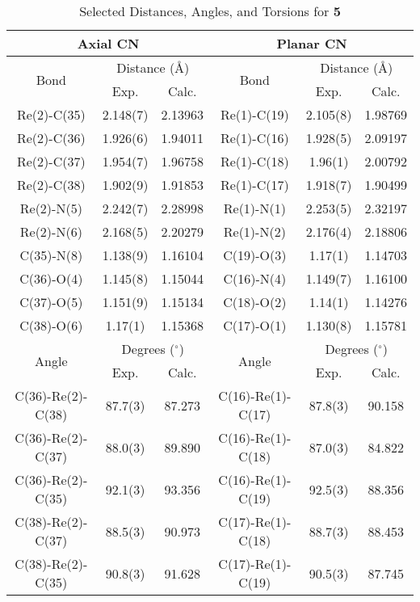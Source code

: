 \begin{table}[htbp]
  \caption{Selected Distances, Angles, and Torsions for \textbf{5}}
  \centering
    \begin{tabular}{cccccc}
    \toprule
    \multicolumn{3}{c}{Axial CN} & \multicolumn{3}{c}{Planar CN} \\ \midrule
    \multirow{2}{*}{Bond} & \multicolumn{2}{c}{Distance (\r{A})} & \multirow{2}{*}{Bond} & \multicolumn{2}{c}{Distance (\r{A})} \\ \cline{2-3} \cline {5-6}
     & Exp. & Calc. & & Exp. & Calc. \\ \midrule
    Re(2)-C(35) & 2.148(7) & 2.13963 & Re(1)-C(19) & 2.105(8) & 1.98769 \\
    Re(2)-C(36) & 1.926(6) & 1.94011 & Re(1)-C(16) & 1.928(5) & 2.09197 \\
    Re(2)-C(37) & 1.954(7) & 1.96758 & Re(1)-C(18) & 1.96(1) & 2.00792 \\
    Re(2)-C(38) & 1.902(9) & 1.91853 & Re(1)-C(17) & 1.918(7) & 1.90499 \\
    Re(2)-N(5) & 2.242(7) & 2.28998 & Re(1)-N(1) & 2.253(5) & 2.32197 \\
    Re(2)-N(6) & 2.168(5) & 2.20279 & Re(1)-N(2) & 2.176(4) & 2.18806 \\
    C(35)-N(8) & 1.138(9) & 1.16104 & C(19)-O(3) & 1.17(1) & 1.14703 \\
    C(36)-O(4) & 1.145(8) & 1.15044 & C(16)-N(4) & 1.149(7) & 1.16100 \\
    C(37)-O(5) & 1.151(9) & 1.15134 & C(18)-O(2) & 1.14(1) & 1.14276 \\
    C(38)-O(6) & 1.17(1) & 1.15368 & C(17)-O(1) & 1.130(8) & 1.15781 \\ \midrule
    \multirow{2}{*}{Angle} & \multicolumn{2}{c}{Degrees ($^\circ$)} & \multirow{2}{*}{Angle} & \multicolumn{2}{c}{Degrees ($^\circ$)} \\ \cline{2-3} \cline {5-6}
     & Exp. & Calc. & & Exp. & Calc. \\ \midrule
    C(36)-Re(2)-C(38) & 87.7(3) & 87.273 & C(16)-Re(1)-C(17) & 87.8(3) & 90.158 \\
    C(36)-Re(2)-C(37) & 88.0(3) & 89.890 & C(16)-Re(1)-C(18) & 87.0(3) & 84.822 \\
    C(36)-Re(2)-C(35) & 92.1(3) & 93.356 & C(16)-Re(1)-C(19) & 92.5(3) & 88.356 \\
    C(38)-Re(2)-C(37) & 88.5(3) & 90.973 & C(17)-Re(1)-C(18) & 88.7(3) & 88.453 \\
    C(38)-Re(2)-C(35) & 90.8(3) & 91.628 & C(17)-Re(1)-C(19) & 90.5(3) & 87.745 \\

\end{tabular}
\end{table}
